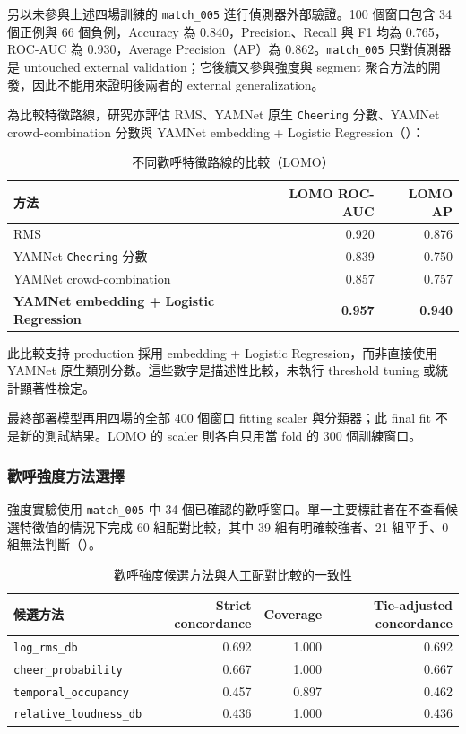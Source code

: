 另以未參與上述四場訓練的 \texttt{match\_005} 進行偵測器外部驗證。100 個窗口包含 34 個正例與 66 個負例，Accuracy 為 0.840，Precision、Recall 與 F1 均為 0.765，ROC-AUC 為 0.930，Average Precision（AP）為 0.862。\texttt{match\_005} 只對偵測器是 untouched external validation；它後續又參與強度與 segment 聚合方法的開發，因此不能用來證明後兩者的 external generalization。

為比較特徵路線，研究亦評估 RMS、YAMNet 原生 \texttt{Cheering} 分數、YAMNet crowd-combination 分數與 YAMNet embedding + Logistic Regression（）：

\begin{table}[htbp]
  \centering
  \small
  \caption{不同歡呼特徵路線的比較（LOMO）}
  \label{tab:cheer-features}
  \begin{tabular}{|l|r|r|}
    \hline
    方法 & LOMO ROC-AUC & LOMO AP \\ \hline
    RMS & 0.920 & 0.876 \\ \hline
    YAMNet \texttt{Cheering} 分數 & 0.839 & 0.750 \\ \hline
    YAMNet crowd-combination & 0.857 & 0.757 \\ \hline
    \textbf{YAMNet embedding + Logistic Regression} & \textbf{0.957} & \textbf{0.940} \\ \hline
  \end{tabular}
\end{table}

此比較支持 production 採用 embedding + Logistic Regression，而非直接使用 YAMNet 原生類別分數。這些數字是描述性比較，未執行 threshold tuning 或統計顯著性檢定。

最終部署模型再用四場的全部 400 個窗口 fitting scaler 與分類器；此 final fit 不是新的測試結果。LOMO 的 scaler 則各自只用當 fold 的 300 個訓練窗口。

\subsubsection{歡呼強度方法選擇}

強度實驗使用 \texttt{match\_005} 中 34 個已確認的歡呼窗口。單一主要標註者在不查看候選特徵值的情況下完成 60 組配對比較，其中 39 組有明確較強者、21 組平手、0 組無法判斷（）。

\begin{table}[htbp]
  \centering
  \small
  \caption{歡呼強度候選方法與人工配對比較的一致性}
  \label{tab:cheer-intensity}
  \begin{tabular}{|l|r|r|r|}
    \hline
    候選方法 & Strict concordance & Coverage & Tie-adjusted concordance \\ \hline
    \texttt{log\_rms\_db} & 0.692 & 1.000 & 0.692 \\ \hline
    \texttt{cheer\_probability} & 0.667 & 1.000 & 0.667 \\ \hline
    \texttt{temporal\_occupancy} & 0.457 & 0.897 & 0.462 \\ \hline
    \texttt{relative\_loudness\_db} & 0.436 & 1.000 & 0.436 \\ \hline
  \end{tabular}
\end{table}

